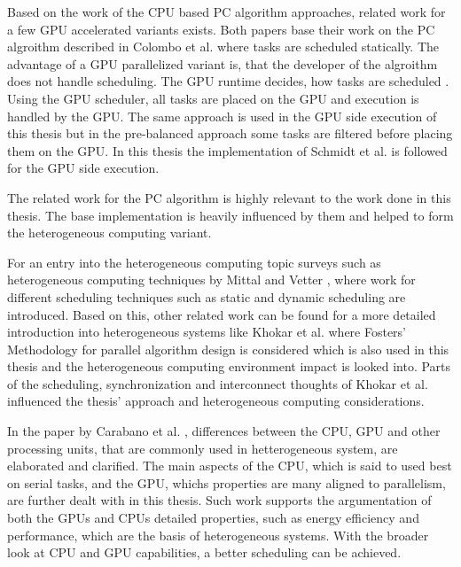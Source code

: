Based on the work of the CPU based PC algorithm approaches, related work for a few GPU accelerated variants \cite{schmidtOrderIndependentConstraintBasedCausal2018,zarebavaniCuPCCUDAbasedParallel2018} exists. Both papers base their work on the PC algroithm described in Colombo et al. \cite{colomboOrderIndependentConstraintBasedCausal} where tasks are scheduled statically. The advantage of a GPU parallelized variant is, that the developer of the algroithm does not handle scheduling. The GPU runtime decides, how tasks are scheduled \cite{olmedoDissectingCUDAScheduling2020}. Using the GPU scheduler, all tasks are placed on the GPU and execution is handled by the GPU. The same approach is used in the GPU side execution of this thesis but in the pre-balanced approach some tasks are filtered before placing them on the GPU. In this thesis the implementation of Schmidt et al. \cite{schmidtOrderIndependentConstraintBasedCausal2018} is followed for the GPU side execution.

The related work for the PC algorithm is highly relevant to the work done in this thesis. The base implementation is heavily influenced by them and helped to form the heterogeneous computing variant.

For an entry into the heterogeneous computing topic surveys such as heterogeneous computing techniques by Mittal and Vetter \cite{mittalSurveyCPUGPUHeterogeneous2015}, where work for different scheduling techniques such as static and dynamic scheduling are introduced. Based on this, other related work can be found for a more detailed introduction into heterogeneous systems like Khokar et al. \cite{khokharHeterogeneousComputingChallenges1993} where Fosters' Methodology for parallel algorithm design is considered which is also used in this thesis and the heterogeneous computing environment impact is looked into. Parts of the scheduling, synchronization and interconnect thoughts of Khokar et al. \cite{khokharHeterogeneousComputingChallenges1993} influenced the thesis' approach and heterogeneous computing considerations.

In the paper by Carabano et al. \cite{carabanoExplorationHeterogeneousSystems2013}, differences between the CPU, GPU and other processing units, that are commonly used in hetterogeneous system, are elaborated and clarified. The main aspects of the CPU, which is said to used best on serial tasks, and the GPU, whichs properties are many aligned to parallelism, are further dealt with in this thesis. Such work supports the argumentation of both the GPUs and CPUs detailed properties, such as energy efficiency and performance, which are the basis of heterogeneous systems. With the broader look at CPU and GPU capabilities, a better scheduling can be achieved.

